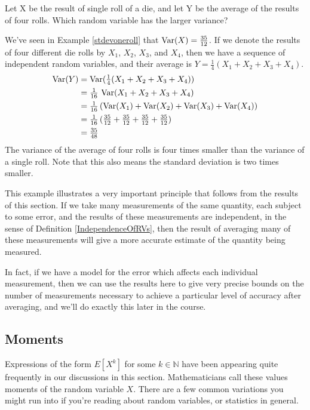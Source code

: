 \begin{examp}Let X be the result of single roll of a die, and let Y be the average of the results of four rolls. Which random variable has the larger variance?

\noindent We've seen in Example \ref{stdevoneroll} that $\operatorname{Var}(X) = \frac{35}{12}$. If we denote the results of four different die rolls by $X_1$, $X_2$, $X_3$, and $X_4$, then we have a sequence of independent random variables, and their average is $Y = \frac{1}{4}(X_1 + X_2 + X_3 + X_4)$.
$$\begin{aligned}\operatorname{Var}(Y) &= \operatorname{Var}(\textstyle\frac{1}{4}(X_1 + X_2 + X_3 + X_4)) \\
&= \textstyle\frac{1}{16}\,\operatorname{Var}(X_1 + X_2 + X_3 + X_4) \\
&= \textstyle\frac{1}{16}\,(\operatorname{Var}(X_1) + \operatorname{Var}(X_2) + \operatorname{Var}(X_3) + \operatorname{Var}(X_4)) \\
&= \textstyle\frac{1}{16}\,(\frac{35}{12} + \frac{35}{12} + \frac{35}{12} + \frac{35}{12}) \\
&= \textstyle\frac{35}{48} \\
\end{aligned}$$
The variance of the average of four rolls is four times smaller than the variance of a single roll. Note that this also means the standard deviation is two times smaller.
\end{examp}

This example illustrates a very important principle that follows from the results of this section. If we take many measurements of the same quantity, each subject to some error, and the results of these measurements are independent, in the sense of Definition \ref{IndependenceOfRVs}, then the result of averaging many of these measurements will give a more accurate estimate of the quantity being measured.

In fact, if we have a model for the error which affects each individual measurement, then we can use the results here to give very precise bounds on the number of measurements necessary to achieve a particular level of accuracy after averaging, and we'll do exactly this later in the course.

\subsection*{Moments}

Expressions of the form $E[X^k]$ for some $k \in \mathbb{N}$ have been appearing quite frequently in our discussions in this section. Mathematicians call these values moments of the random variable $X$. There are a few common variations you might run into if you're reading about random variables, or statistics in general.

